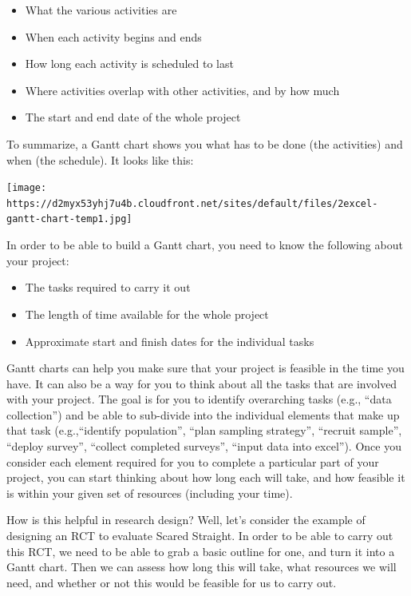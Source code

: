 \documentclass[
]{book}
\providecommand{\tightlist}{%
  \setlength{\itemsep}{0pt}\setlength{\parskip}{0pt}}
\begin{document}
\begin{itemize}
\tightlist
\item
  What the various activities are
\item
  When each activity begins and ends
\item
  How long each activity is scheduled to last
\item
  Where activities overlap with other activities, and by how much
\item
  The start and end date of the whole project
\end{itemize}

To summarize, a Gantt chart shows you what has to be done (the activities) and when (the schedule). It looks like this:

\texttt{[image: https://d2myx53yhj7u4b.cloudfront.net/sites/default/files/2excel-gantt-chart-temp1.jpg]}

In order to be able to build a Gantt chart, you need to know the following about your project:

\begin{itemize}
\tightlist
\item
  The tasks required to carry it out
\item
  The length of time available for the whole project
\item
  Approximate start and finish dates for the individual tasks
\end{itemize}

Gantt charts can help you make sure that your project is feasible in the time you have. It can also be a way for you to think about all the tasks that are involved with your project. The goal is for you to identify overarching tasks (e.g., ``data collection'') and be able to sub-divide into the individual elements that make up that task (e.g.,``identify population'', ``plan sampling strategy'', ``recruit sample'', ``deploy survey'', ``collect completed surveys'', ``input data into excel''). Once you consider each element required for you to complete a particular part of your project, you can start thinking about how long each will take, and how feasible it is within your given set of resources (including your time).

How is this helpful in research design? Well, let's consider the example of designing an RCT to evaluate Scared Straight. In order to be able to carry out this RCT, we need to be able to grab a basic outline for one, and turn it into a Gantt chart. Then we can assess how long this will take, what resources we will need, and whether or not this would be feasible for us to carry out.
\end{document}

